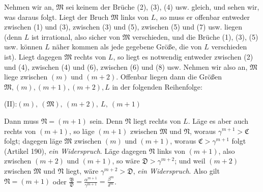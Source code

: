 Nehmen wir an, $\mathfrak{M}$ sei keinem der Brüche (2), (3), (4) usw. gleich, und sehen wir, was daraus folgt. Liegt der Bruch $\mathfrak{M}$ links von $L$, so muss er offenbar entweder zwischen (1) und (3), zwischen (3) und (5), zwischen (5) und (7) usw. liegen (denn $L$ ist irrational, also sicher von $\mathfrak{M}$ verschieden, und die Brüche (1), (3), (5) usw. können $L$ näher kommen als jede gegebene Größe, die von $L$ verschieden ist). Liegt dagegen $\mathfrak{M}$ rechts von $L$, so liegt es notwendig entweder zwischen (2) und (4), zwischen (4) und (6), zwischen (6) und (8) usw. Nehmen wir also an, $\mathfrak{M}$ liege zwischen
$(m)$ und $(m+2)$. Offenbar liegen dann die Größen $\mathfrak{M},(m),(m+1),(m+2),L$ in der folgenden Reihenfolge:
\begin{center}
(II):\qquad $(m),\ (\mathfrak{M}),\ (m+2),\ L,\ (m+1)$
\end{center}
Dann muss $\mathfrak{N}=(m+1)$ sein. Denn $\mathfrak{N}$ liegt rechts von $L$. Läge es aber auch rechts von $(m+1)$, so läge $(m+1)$ zwischen $\mathfrak{M}$ und $\mathfrak{N}$, woraus $\gamma^{m+1}>\mathfrak{C}$ folgt; dagegen läge $\mathfrak{M}$ zwischen $(m)$ und $(m+1)$, woraus $\mathfrak{C}>\gamma^{m+1}$ folgt (Artikel 190), \textit{ein Widerspruch}. Läge dagegen $\mathfrak{N}$ links von $(m+1)$, also zwischen $(m+2)$ und $(m+1)$, so wäre $\mathfrak{D}>\gamma^{m+2}$; und weil $(m+2)$ zwischen $\mathfrak{M}$ und $\mathfrak{N}$ liegt, wäre $\gamma^{m+2}>\mathfrak{D}$, \textit{ein Widerspruch}. Also gilt $\mathfrak{N}=(m+1)$ oder $\frac{\mathfrak{B}}{\mathfrak{D}}=\frac{\alpha^{m+1}}{\gamma^{m+1}}=\frac{\beta^m}{\delta^m}$.

